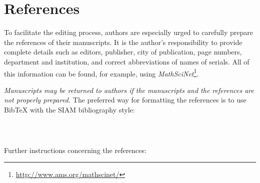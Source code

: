 \documentclass[parskip]{scrartcl}
\begin{document}
\section{References}
To facilitate the editing process, authors are especially urged to carefully
prepare the references of their manuscripts.
It is the author's responsibility to provide complete details such as editors,
publisher, city of publication, page numbers, department and institution, and
correct abbreviations of
names of serials. All of this information can be found, for example, using
\emph{MathSciNet}\footnote{\url{http://www.ams.org/mathscinet/}}.

%
\emph{Manuscripts may be returned to authors if the manuscripts and the
references are not properly prepared.} The preferred way for formatting the
references is to use BibTeX with the SIAM bibliography style:
\begin{verbatim}
         
         
\end{verbatim}

Further instructions concerning the references:
\end{document}
